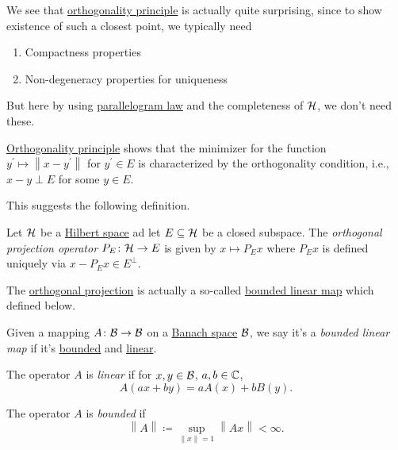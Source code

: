 We see that \hyperref[thm:orthogonality-principle]{orthogonality principle} is actually quite surprising, since to show existence of such a closest point, we typically need
\begin{enumerate}
	\item Compactness properties
	\item Non-degeneracy properties for uniqueness
\end{enumerate}
But here by using \hyperref[lma:parallelogram-law]{parallelogram law} and the completeness of \(\mathcal{\MakeUppercase{h}} \), we don't need these.

\begin{remark}
	\hyperref[thm:orthogonality-principle]{Orthogonality principle} shows that the minimizer for the function \(y^\prime \mapsto \left\lVert x - y^\prime \right\rVert \) for \(y^\prime \in E\) is characterized by the orthogonality condition, i.e., \(x - y\perp E\) for some \(y\in E\).
\end{remark}

This suggests the following definition.

\begin{definition}\label{def:orthogonal-projection}
	Let \(\mathcal{\MakeUppercase{h}} \) be a \hyperref[def:Hilbert-space]{Hilbert space} ad let \(E\subseteq \mathcal{\MakeUppercase{h}} \) be a closed subspace. The \emph{orthogonal projection operator} \(P_E\colon \mathcal{\MakeUppercase{h}} \to E\) is given by \(x \mapsto P_E x\) where \(P_E x\) is defined uniquely via \(x - P_E x\in E^\perp\).
\end{definition}

The \hyperref[def:orthogonal-projection]{orthogonal projection} is actually a so-called \hyperref[def:bounded-linear-map]{bounded linear map} which defined below.

\begin{definition}\label{def:bounded-linear-map}
	Given a mapping \(A\colon \mathcal{\MakeUppercase{b}} \to \mathcal{\MakeUppercase{b}} \) on a \hyperref[def:Banach-space]{Banach space} \(\mathcal{\MakeUppercase{b}} \), we say it's a \emph{bounded linear map} if it's \hyperref[def:bounded-map]{bounded} and \hyperref[def:linear-map]{linear}.

	\begin{definition}\label{def:linear-map}
		The operator \(A\) is \emph{linear} if for \(x, y\in \mathcal{\MakeUppercase{b}} \), \(a, b\in \mathbb{\MakeUppercase{c}} \),
		\[
			A(ax + by) = a A(x) + b B(y).
		\]
	\end{definition}

	\begin{definition}\label{def:bounded-map}
		The operator \(A\) is \emph{bounded} if
		\[
			\left\lVert A\right\rVert \coloneqq \sup _{\left\lVert x\right\rVert = 1} \left\lVert Ax\right\rVert < \infty.
		\]
	\end{definition}
\end{definition}

